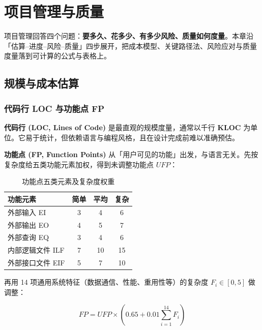 \clearpage
\begingroup
\let\clearpage\relax
\let\cleardoublepage\relax
\vspace*{\fill}
\chapter{项目管理与质量}
\begin{center}
项目管理回答四个问题：\textbf{要多久、花多少、有多少风险、质量如何度量}。本章沿「估算--进度--风险--质量」四步展开，把成本模型、关键路径法、风险应对与质量度量落到可计算的公式与表格上。
\end{center}
\vspace*{\fill}
\endgroup
\clearpage

\section{规模与成本估算}

\subsection{代码行 LOC 与功能点 FP}

\textbf{代码行 (LOC, Lines of Code)} 是最直观的规模度量，通常以千行 \textbf{KLOC} 为单位。它易于统计，但依赖语言与编程风格，且在设计完成前难以准确预估。

\textbf{功能点 (FP, Function Points)} 从「用户可见的功能」出发，与语言无关。先按复杂度给五类功能元素加权，得到未调整功能点 $UFP$：

\begin{table}[H]
\centering
\caption{功能点五类元素及复杂度权重}
\begin{tabulary}{\textwidth}{LCCC}
\toprule
功能元素 & 简单 & 平均 & 复杂 \\
\midrule
外部输入 EI & 3 & 4 & 6 \\
外部输出 EO & 4 & 5 & 7 \\
外部查询 EQ & 3 & 4 & 6 \\
内部逻辑文件 ILF & 7 & 10 & 15 \\
外部接口文件 EIF & 5 & 7 & 10 \\
\bottomrule
\end{tabulary}
\end{table}

再用 14 项通用系统特征（数据通信、性能、重用性等）的复杂度 $F_i\in[0,5]$ 做调整：

\begin{equation}
    FP = UFP \times \left(0.65 + 0.01\sum_{i=1}^{14} F_i\right)
\end{equation}

